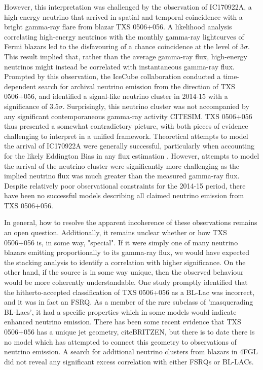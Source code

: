  However, this interpretation was challenged by the observation of IC170922A, a high-energy neutrino that arrived in spatial and temporal coincidence with a bright gamma-ray flare from blazar TXS 0506+056. A likelihood analysis correlating high-energy neutrinos with the monthly gamma-ray lightcurves of Fermi blazars led to the disfavouring of a chance coincidence at the level of $3 \sigma$. This result implied that, rather than the average gamma-ray flux, high-energy neutrinos might instead be correlated with instantaneous gamma-ray flux. Prompted by this observation, the IceCube collaboration conducted a time-dependent search for archival neutrino emission from the direction of TXS 0506+056, and identified a signal-like neutrino cluster in 2014-15 with a significance of $3.5 \sigma$. Surprisingly, this neutrino cluster was not accompanied by any significant contemporaneous gamma-ray activity CITESIM. TXS 0506+056 thus presented a somewhat contradictory picture, with both pieces of evidence challenging to interpret in a unified framework. Theoretical attempts to model the arrival of IC170922A were generally successful, particularly when accounting for the likely Eddington Bias in any flux estimation . However, attempts to model the arrival of the neutrino cluster were significantly more challenging as the implied neutrino flux was much greater than the measured gamma-ray flux. Despite relatively poor observational constraints for the 2014-15 period, there have been no successful models describing all claimed neutrino emission from TXS 0506+056.
 
 In general, how to resolve the apparent incoherence of these observations remains an open question. Additionally, it remains unclear whether or how TXS 0506+056 is, in some way, "special". If it were simply one of many neutrino blazars emitting proportionally to its gamma-ray flux, we would have expected the stacking analysis to identify a correlation with higher significance.  On the other hand, if the source is in some way unique, then the observed behaviour would be more coherently understandable. One study promptly identified that the hitherto-accepted classification of TXS 0506+056 as a BL-Lac was incorrect, and it was in fact an FSRQ. As a member of the rare subclass of 'masquerading BL-Lacs', it had a specific properties which in some models would indicate enhanced neutrino emission. There has been some recent evidence that TXS 0506+056 has a unique jet geometry, citeBRITZEN, but there is to date there is no model which has attempted to connect this geometry to observations of neutrino emission. A search for additional neutrino clusters from blazars in 4FGL did not reveal any significant excess correlation with either FSRQs or BL-LACs.
 
